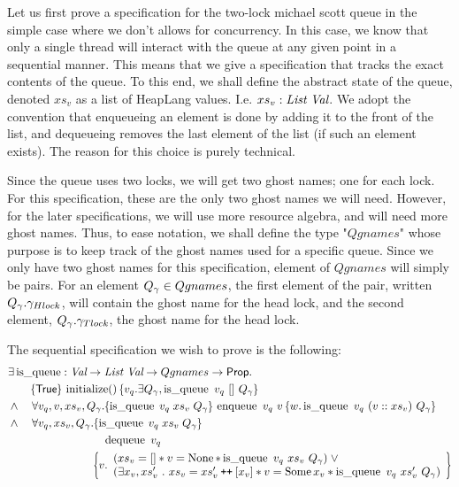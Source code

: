 \documentclass[twoside,11pt,openright]{report}
\newcommand{\initialise}{\operatorname{initialize}}
\newcommand{\enqueue}{\operatorname{enqueue}}
\newcommand{\dequeue}{\operatorname{dequeue}}
\newcommand{\isqueue}{\operatorname{is\_queue}}
\newcommand\catenate{\mathbin{\text{\ttfamily\upshape ++}}}
\begin{document}
Let us first prove a specification for the two-lock michael scott queue in the simple case where we don't allows for concurrency. In this case, we know that only a single thread will interact with the queue at any given point in a sequential manner. This means that we give a specification that tracks the exact contents of the queue. To this end, we shall define the abstract state of the queue, denoted $xs_v$ as a list of HeapLang values. I.e. $xs_v : \textit{List} \ \textit{Val}$. We adopt the convention that enqueueing an element is done by adding it to the front of the list, and dequeueing removes the last element of the list (if such an element exists). The reason for this choice is purely technical.

Since the queue uses two locks, we will get two ghost names; one for each lock. For this specification, these are the only two ghost names we will need. However, for the later specifications, we will use more resource algebra, and will need more ghost names. Thus, to ease notation, we shall define the type "$Qgnames$" whose purpose is to keep track of the ghost names used for a specific queue. Since we only have two ghost names for this specification, element of $Qgnames$ will simply be pairs. For an element $Q_\gamma \in Qgnames$, the first element of the pair, written $Q_\gamma.\gamma_{Hlock}$, will contain the ghost name for the head lock, and the second element, $Q_\gamma.\gamma_{Tlock}$, the ghost name for the head lock.

The sequential specification we wish to prove is the following:
\begin{align*}
  &\exists \isqueue : \Val \to \List \ \Val \to Qgnames \to \Prop.\\
  &\quad\quad\hoare{\TRUE}{\initialise \TT}{v_q . \exists Q_\gname, \isqueue\ v_q\ []\ Q_\gname}\\
  &\land\quad\forall v_q, v, xs_v, Q_\gname. \hoare{\isqueue \; v_q \; xs_v \; Q_\gname}{\enqueue\ v_q\ v}{w . \isqueue\ v_q\ (v :: xs_v)\ Q_\gname}\\
  &\land\quad\forall v_q, xs_v, Q_\gname. \hoareV[t]{\isqueue \; v_q \; xs_v \; Q_\gname}{\dequeue\ v_q}{v . \begin{array}{l}(xs_v = [] \ast v = \None \ast \isqueue\ v_q\ xs_v\ Q_\gname) \; \lor\\ (\exists x_v, xs_v' \ . \ xs_v = xs_v' \catenate [x_v] \ast v = \Some x_v \ast \isqueue\ v_q\ xs_v'\ Q_\gname) \end{array}}
\end{align*}
\end{document}
